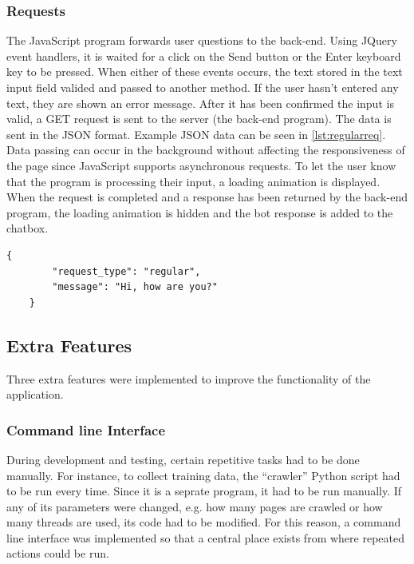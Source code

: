 \documentclass[12pt,a4paper]{article}
\newcommand{\captionstyle}[1] {
    \small{#1}
}
\begin{document}
\subsubsection{Requests}
The JavaScript program forwards user questions to the back-end. Using JQuery event handlers, it is waited for a click on the Send button or the Enter keyboard key to be pressed. When either of these events occurs, the text stored in the text input field valided and passed to another method. If the user hasn’t entered any text, they are shown an error message. After it has been confirmed the input is valid, a GET request is sent to the server (the back-end program). The data is sent in the JSON format. Example JSON data can be seen in \cref{lst:regularreq}. Data passing can occur in the background without affecting the responsiveness of the page since JavaScript supports asynchronous requests. To let the user know that the program is processing their input, a loading animation is displayed. When the request is completed and a response has been returned by the back-end program, the loading animation is hidden and the bot response is added to the chatbox.   

\begin{minipage}{\linewidth}
	\begin{lstlisting}[caption={\captionstyle{Example data sent to the back-end for processing in the JSON format.}}, label={lst:regularreq}]
	{
		"request_type": "regular",
		"message": "Hi, how are you?"
	}
	\end{lstlisting}
\end{minipage}

\subsection{Extra Features}
Three extra features were implemented to improve the functionality of the application. 

\subsubsection{Command line Interface}
During development and testing, certain repetitive tasks had to be done manually. For instance, to collect training data, the “crawler” Python script had to be run every time. Since it is a seprate program, it had to be run manually. If any of its parameters were changed, e.g. how many pages are crawled or how many threads are used, its code had to be modified. For this reason, a command line interface was implemented so that a central place exists from where repeated actions could be run. 
\end{document}
